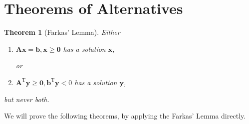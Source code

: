 \documentclass[12pt]{article}
\newcommand{\trans}{^{\mathrm T}}
\newtheorem{theorem}{Theorem}[section]
\begin{document}


\section{Theorems of Alternatives}

\begin{theorem}[Farkas' Lemma]
Either
\begin{enumerate}
\item[(I)]
$\bm A\bm x=\bm b,\bm x\ge\bm0$ has a solution $\bm x$,

or
\item[(II)]
$\bm A\trans\bm y\ge\bm0,\bm b\trans\bm y<0$ has a solution $\bm y$,
\end{enumerate}
but never both.
\end{theorem}

We will prove the following theorems, by applying the Farkas' Lemma directly.
\end{document}
